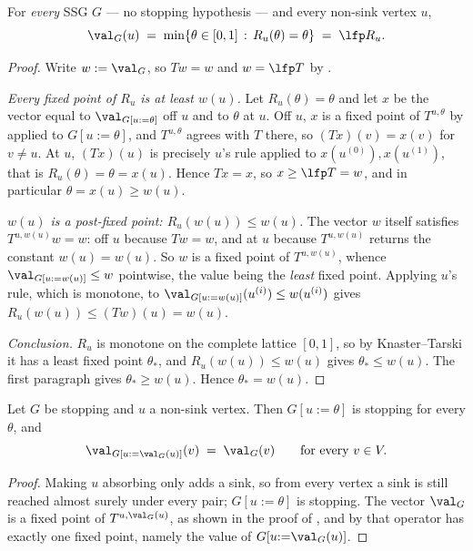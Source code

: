 \begin{theorem}\label{thm:bv-lfp}
For \emph{every} SSG $G$ --- no stopping hypothesis --- and every non-sink
vertex $u$,
\[
  \val_G(u)\;=\;\min\{\theta\in[0,1]\,:\,R_u(\theta)=\theta\}
             \;=\;\lfp R_u .
\]
\end{theorem}

\begin{proof}
Write $w:=\val_G$, so $Tw=w$ and $w=\lfp T$ by .

\emph{Every fixed point of $R_u$ is at least $w(u)$.} Let
$R_u(\theta)=\theta$ and let $x$ be the vector equal to
$\val_{G[u:=\theta]}$ off $u$ and to $\theta$ at $u$. Off $u$, $x$ is a
fixed point of $T^{u,\theta}$ by  applied to
$G[u{:=}\theta]$, and $T^{u,\theta}$ agrees with $T$ there, so
$(Tx)(v)=x(v)$ for $v\neq u$. At $u$, $(Tx)(u)$ is precisely $u$'s rule
applied to $x(u^{(0)}),x(u^{(1)})$, that is $R_u(\theta)=\theta=x(u)$.
Hence $Tx=x$, so $x\ge\lfp T=w$, and in particular $\theta=x(u)\ge w(u)$.

\emph{$w(u)$ is a post-fixed point: $R_u(w(u))\le w(u)$.} The vector $w$
itself satisfies $T^{u,w(u)}w=w$: off $u$ because $Tw=w$, and at $u$
because $T^{u,w(u)}$ returns the constant $w(u)=w(u)$. So $w$ is a fixed
point of $T^{u,w(u)}$, whence $\val_{G[u:=w(u)]}\le w$ pointwise, the
value being the \emph{least} fixed point. Applying $u$'s rule, which is
monotone, to $\val_{G[u:=w(u)]}(u^{(i)})\le w(u^{(i)})$ gives
$R_u(w(u))\le (Tw)(u)=w(u)$.

\emph{Conclusion.} $R_u$ is monotone on the complete lattice $[0,1]$, so
by Knaster--Tarski it has a least fixed point $\theta_\ast$, and
$R_u(w(u))\le w(u)$ gives $\theta_\ast\le w(u)$. The first paragraph
gives $\theta_\ast\ge w(u)$. Hence $\theta_\ast=w(u)$.
\end{proof}

\begin{lemma}[Substitution]\label{lem:bv-subst}
Let $G$ be stopping and $u$ a non-sink vertex. Then $G[u{:=}\theta]$ is
stopping for every $\theta$, and
\[
  \val_{G[u:=\val_G(u)]}(v)\;=\;\val_G(v)\qquad\text{for every }v\in V .
\]
\end{lemma}

\begin{proof}
Making $u$ absorbing only adds a sink, so from every vertex a sink is
still reached almost surely under every pair; $G[u{:=}\theta]$ is
stopping. The vector $\val_G$ is a fixed point of $T^{u,\val_G(u)}$, as
shown in the proof of , and by 
that operator has exactly one fixed point, namely the value of
$G[u{:=}\val_G(u)]$.
\end{proof}

